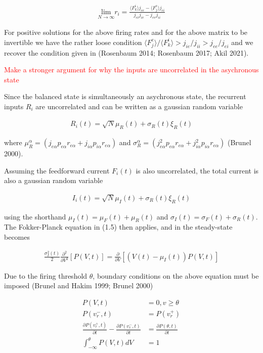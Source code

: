\documentclass{ucetd}
\begin{document}
\begin{align}
\underset{N\rightarrow \infty}{\mathrm{lim}}r_{i} = \frac{\langle F_{k}^{i}\rangle j_{ee}-\langle F_{j}^{e}\rangle j_{ei}}{j_{ei}j_{ie} - j_{ee}j_{ii}}
\end{align}

For positive solutions for the above firing rates and for the above matrix to be invertible we have the rather loose condition $\langle F_{j}^{e}\rangle/\langle F_{k}^{i}\rangle > j_{ie}/j_{ii} > j_{ee}/j_{ei}$ and we recover the condition given in (Rosenbaum 2014; Rosenbaum 2017; Akil 2021). 

\textcolor{red}{Make a stronger argument for why the inputs are uncorrelated in the asychronous state}

Since the balanced state is simultaneously an asychronous state, the recurrent inputs $R_{i}$ are uncorrelated and can be written as a gaussian random variable

\begin{align*}
R_{i}(t) = \sqrt{N}\mu_{R}(t) + \sigma_{R}(t)\xi_{R}(t)
\end{align*}

where $\mu_{R}^{\alpha} = (j_{e\alpha}p_{e\alpha}r_{e\alpha} + j_{i\alpha}p_{i\alpha}r_{e\alpha})$ and $\sigma_{R}^{\alpha} = (j_{e\alpha}^{2}p_{e\alpha}r_{e\alpha} + j_{i\alpha}^{2}p_{i\alpha}r_{e\alpha})$ (Brunel 2000).


Assuming the feedforward current $F_{i}(t)$ is also uncorrelated, the total current is also a gaussian random variable 

\begin{align*}
I_{i}(t) = \sqrt{N}\mu_{I}(t) + \sigma_{R}(t)\xi_{R}(t)
\end{align*}


using the shorthand $\mu_{I}(t) = \mu_{F}(t) + \mu_{R}(t)$ and $\sigma_{I}(t) = \sigma_{F}(t) + \sigma_{R}(t)$. The Fokker-Planck equation in (1.5) then applies, and in the steady-state becomes

\begin{align}
\frac{\sigma_{I}^{2}(t)}{2}\frac{\partial^{2}}{\partial V^{2}}[P(V,t)] = \frac{\partial}{\partial V}[\left(V(t)-\mu_{I}(t)\right) P(V,t)]
\end{align}

Due to the firing threshold $\theta$, boundary conditions on the above equation must be imposed (Brunel and Hakim 1999; Brunel 2000)

\begin{align*}
P(V,t) &= 0, v\geq \theta\\
P(v_{r}^{-},t) &= P(v_{r}^{+})\\
\frac{\partial P(v_{r}^{+},t)}{\partial t}-\frac{\partial P(v_{r}^{-},t)}{\partial t} &= \frac{\partial P(\theta,t)}{\partial t}\\
\int_{-\infty}^{\theta} P(V,t)dV &= 1
\end{align*}
\end{document}
